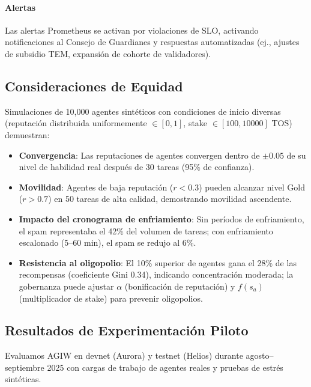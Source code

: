 \documentclass[11pt]{article}
\begin{document}
\paragraph{Alertas} Las alertas Prometheus se activan por violaciones de SLO, activando notificaciones al Consejo de Guardianes y respuestas automatizadas (ej., ajustes de subsidio TEM, expansión de cohorte de validadores).

\subsection{Consideraciones de Equidad}
Simulaciones de 10,000 agentes sintéticos con condiciones de inicio diversas (reputación distribuida uniformemente $\in [0,1]$, stake $\in [100, 10000]$ TOS) demuestran:
\begin{itemize}[noitemsep]
  \item \textbf{Convergencia}: Las reputaciones de agentes convergen dentro de $\pm0.05$ de su nivel de habilidad real después de 30 tareas (95\% de confianza).
  \item \textbf{Movilidad}: Agentes de baja reputación ($r<0.3$) pueden alcanzar nivel Gold ($r>0.7$) en 50 tareas de alta calidad, demostrando movilidad ascendente.
  \item \textbf{Impacto del cronograma de enfriamiento}: Sin períodos de enfriamiento, el spam representaba el 42\% del volumen de tareas; con enfriamiento escalonado (5--60 min), el spam se redujo al 6\%.
  \item \textbf{Resistencia al oligopolio}: El 10\% superior de agentes gana el 28\% de las recompensas (coeficiente Gini 0.34), indicando concentración moderada; la gobernanza puede ajustar $\alpha$ (bonificación de reputación) y $f(s_a)$ (multiplicador de stake) para prevenir oligopolios.
\end{itemize}

\subsection{Resultados de Experimentación Piloto}
\label{sec:pilot-results}
Evaluamos AGIW en devnet (Aurora) y testnet (Helios) durante agosto--septiembre 2025 con cargas de trabajo de agentes reales y pruebas de estrés sintéticas.
\end{document}
